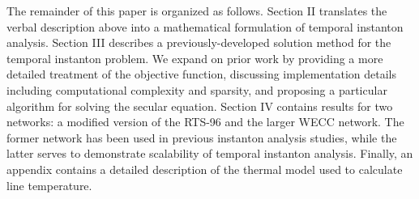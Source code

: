 \documentclass[conference]{IEEEtran}
\begin{document}
The remainder of this paper is organized as follows. Section II translates the verbal description above into a mathematical formulation of temporal instanton analysis. Section III describes a previously-developed solution method for the temporal instanton problem. We expand on prior work by providing a more detailed treatment of the objective function, discussing implementation details including computational complexity and sparsity, and proposing a particular algorithm for solving the secular equation. Section IV contains results for two networks: a modified version of the RTS-96 and the larger WECC network. The former network has been used in previous instanton analysis studies, while the latter serves to demonstrate scalability of temporal instanton analysis. Finally, an appendix contains a detailed description of the thermal model used to calculate line temperature.
\end{document}
